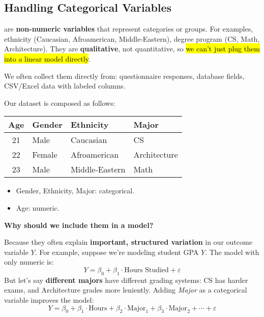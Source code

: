 \subsection{Handling Categorical Variables}

 are \textbf{non-numeric variables} that represent categories or groups. For examples, ethnicity (Caucasian, Afroamerican, Middle-Eastern), degree program (CS, Math, Architecture). They are \textbf{qualitative}, not quantitative, so \hl{we can't just plug them into a linear model directly}.

\highspace
We often collect them directly from: questionnaire responses, database fields, CSV/Excel data with labeled columns.

\begin{examplebox}
    Our dataset is composed as follows:
    \begin{center}
        \begin{tabular}{@{} c | l | l | l @{}}
            \toprule
            Age & Gender & Ethnicity & Major \\
            \midrule
            21 & Male   & Caucasian         & CS \\ [.3em]
            22 & Female & Afroamerican      & Architecture \\ [.3em]
            23 & Male   & Middle-Eastern    & Math \\ [.3em]
            \bottomrule
        \end{tabular}
    \end{center}
    \begin{itemize}
        \item Gender, Ethnicity, Major: categorical.
        \item Age: numeric.
    \end{itemize}
\end{examplebox}

\highspace
\begin{flushleft}
    \textcolor{Green3}{ \textbf{Why should we include them in a model?}}
\end{flushleft}
Because they often explain \textbf{important, structured variation} in our outcome variable $Y$. For example, suppose we're modeling student GPA $Y$. The model with only numeric is:
\begin{equation*}
    Y = \beta_0 + \beta_1 \cdot \text{Hours Studied} + \varepsilon
\end{equation*}
But let's say \textbf{different majors} have different grading systems: CS has harder exams, and Architecture grades more leniently. Adding \emph{Major} as a categorical variable improves the model:
\begin{equation*}
    Y = \beta_0 + \beta_1 \cdot \text{Hours} + \beta_2 \cdot \text{Major}_1 + \beta_3 \cdot \text{Major}_2 + \cdots + \varepsilon
\end{equation*}

